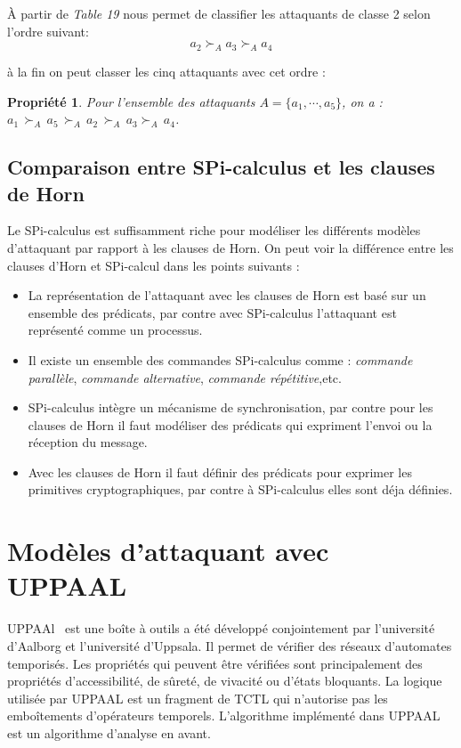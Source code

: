 \documentclass[10pt,a4paper]{article}
\begin{document}
À partir de \textit{Table 19} nous permet de classifier les attaquants de classe 2 selon l'ordre suivant:
\[a_2 {\succ}_{A} a_3 {\succ}_{A} a_4\]

à la fin on peut classer les cinq attaquants avec cet ordre :

\newtheorem{Propriete}{Propriété}
\begin{Propriete}
Pour l'ensemble des attaquants $A=\{a_1,\cdots,a_5\}$, on a :
$a_1\, {\succ}_{A}\, a_5\, {\succ}_{A}\, a_2\, {\succ}_{A}\, a_3 {\succ}_{A}\, a_4$.
\end{Propriete}


\subsection{Comparaison entre SPi-calculus et les clauses de Horn}
Le SPi-calculus est suffisamment riche pour modéliser les différents modèles d'attaquant par rapport à les clauses de Horn. On peut voir la différence entre les clauses d'Horn et SPi-calcul dans les points suivants :\newline

\begin{itemize}
\item La représentation de l’attaquant avec les clauses de Horn est basé sur un ensemble des prédicats, par contre avec SPi-calculus l’attaquant est représenté comme un processus.
\item Il existe un ensemble des commandes SPi-calculus comme : \textit{commande parallèle},    \textit{commande alternative}, \textit{commande répétitive},etc.
\item SPi-calculus intègre un mécanisme de synchronisation, par contre pour les clauses de Horn il faut modéliser des prédicats qui expriment l'envoi ou la réception du message.
\item Avec les clauses de Horn il faut définir des prédicats pour exprimer les primitives cryptographiques, par contre à SPi-calculus elles sont déja définies.
\end{itemize}
\newpage
\section{Modèles d'attaquant avec UPPAAL}
UPPAAl~\cite{ref4} est une bo\^{i}te à outils a été développé conjointement par l'université d'Aalborg et l'université d'Uppsala. Il permet de vérifier des réseaux d'automates temporisés. Les propriétés qui peuvent \^{e}tre vérifiées sont principalement des propriétés d'accessibilité, de sûreté, de vivacité ou d'états bloquants. La logique utilisée par UPPAAL est un fragment de TCTL qui n'autorise pas les embo\^{i}tements d'opérateurs temporels. L'algorithme implémenté dans UPPAAL est un algorithme d'analyse en avant.
   
\end{document}
